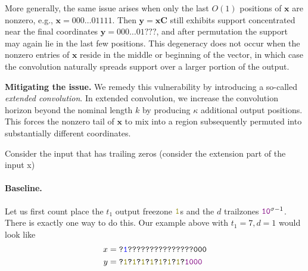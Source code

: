 More generally, the same issue arises when only the last $O(1)$ positions of $\mathbf{x}$ are nonzero, e.g., $\mathbf{x} = 000\ldots01111$.
Then $\mathbf{y} = \mathbf{x}\mathbf{C}$ still exhibits support concentrated near the final coordinates $\mathbf{y} = 000\ldots01???$, and after permutation the support may again lie in the last few positions.
This degeneracy does not occur when the nonzero entries of $\mathbf{x}$ reside in the middle or beginning of the vector, in which case the convolution naturally spreads support over a larger portion of the output.

\medskip
\noindent\textbf{Mitigating the issue.}
We remedy this vulnerability by introducing a so-called \emph{extended convolution}.
In extended convolution, we increase the convolution horizon beyond the nominal length $k$ by producing $\kappa$ additional output positions.
This forces the nonzero tail of $\mathbf{x}$ to mix into a region subsequently permuted into substantially different coordinates.


Consider the input that has trailing zeros (consider the extension part of the input x)

\paragraph{Baseline.}

Let us first count place the $t_1$  output freezone $\olive{1}$s  and the $d$ trailzones $\texttt{\textcolor{violet}{10}}^{\sigma-1}$. There is exactly one way to do this. Our example above with $t_1=7,d=1$ would look like
\begin{align*}
  x&=\texttt{?\blue{1}???????????????000}\\
  y&=\texttt{?\olive{1}?\olive{1}?\olive{1}?\olive{1}?\olive{1}?\olive{1}?\olive{1}?\textcolor{violet}{1000}}
\end{align*}
